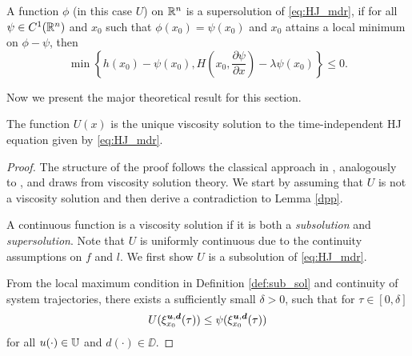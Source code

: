 \begin{for_journal}
\begin{definition} \label{def:sup_sol} 
A function $\phi$ (in this case $U$) on $\mathbb{R}^n$  is a supersolution of \eqref{eq:HJ_mdr}, if for all $\psi \in C^1(\mathbb{R}^n)$ and $x_0$ such that $\phi(x_0) = \psi(x_0)$ and $x_0$ attains a local minimum on $\phi- \psi$, then 
%
\begin{equation}\label{eq:sup_sol}
    \min\left\{h(x_0)-\psi(x_0), H(x_0,\frac{\partial \psi}{\partial x}) - \lambda \psi(x_0)\right\} \leq 0.
\end{equation}
%
\end{definition}


Now we present the major theoretical result for this section.

\begin{theorem}
The function $U(x)$ is the unique viscosity solution to the time-independent HJ equation given by \eqref{eq:HJ_mdr}.

\end{theorem}

\begin{proof}
The structure of the proof follows the classical approach in \cite{Evans1984}, analogously to \cite{Fisac2015}, and draws from viscosity solution theory. We start by assuming that $U$ is not a viscosity solution and then derive a contradiction to Lemma \ref{dpp}. 

A continuous function is a viscosity solution if it is both a \emph{subsolution} and \emph{supersolution}. Note that $U$ is uniformly continuous due to the continuity assumptions on $f$ and $l$. We first show $U$ is a subsolution of \eqref{eq:HJ_mdr}.

From the local maximum condition in Definition \ref{def:sub_sol} and continuity of system trajectories, there exists a sufficiently small $\delta>0$, such that for $\tau \in [0, \delta]$%
\begin{equation*}
U(\xi_{x_0}^{\bm{u}, \bm{d}}(\tau)) \leq \psi(\xi_{x_0}^{\bm{u}, \bm{d}}(\tau))
\end{equation*}
%
for all $u(\cdot) \in \mathbb{U}$ and $d(\cdot) \in \DD$.


\end{proof}
\end{for_journal}
